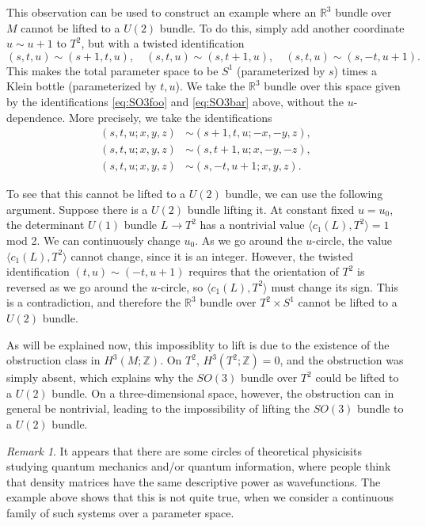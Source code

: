 \documentclass[12pt]{article}
\numberwithin{equation}{section}
\theoremstyle{remark}
\newtheorem{remark}[definition]{Remark}
\def\bR{\mathbb{R}}
\def\bZ{\mathbb{Z}}
\begin{document}
This observation can be used to construct an example
where an $\bR^3$ bundle over $M$ cannot be lifted to a $U(2)$ bundle.
To do this, simply add another coordinate $u\sim u+1$ to $T^2$,
but with a twisted identification \begin{equation}
(s,t,u) \sim (s+1,t,u),\quad
(s,t,u) \sim (s,t+1,u),\quad
(s,t,u) \sim (s,-t,u+1).
\end{equation}
This makes the total parameter space to be $S^1$ (parameterized by $s$)
times a Klein bottle (parameterized by $t,u$).
We take the $\bR^3$ bundle over this space given by the identifications \eqref{eq:SO3foo} and \eqref{eq:SO3bar} above,
without the $u$-dependence. More precisely, we take the identifications \begin{align}
  (s,t,u;x,y,z) &\sim (s+1,t,u;-x,-y,z),\\
  (s,t,u;x,y,z) &\sim (s,t+1,u;x,-y,-z),\\
  (s,t,u;x,y,z) &\sim (s,-t,u+1;x,y,z).
\end{align}

To see that this cannot be lifted to a $U(2)$ bundle, we can use the following argument.
Suppose there is a $U(2)$ bundle lifting it.
At constant fixed $u=u_0$, the determinant $U(1)$ bundle $L\to T^2$
has a nontrivial value $\langle c_1(L),T^2\rangle = 1 $ mod 2.
We can continuously change $u_0$.
As we go around the $u$-circle, the value $ \langle c_1(L),T^2\rangle$
cannot change, since it is an integer.
However, the twisted identification $(t,u)\sim (-t,u+1)$
requires that the orientation of $T^2$ is reversed as we go around the $u$-circle,
so $\langle c_1(L),T^2\rangle$ must change its sign.
This is a contradiction, and therefore the $\bR^3$ bundle over $T^2\times S^1$ cannot be lifted to a $U(2)$ bundle.

As will be explained now, this impossiblity to lift is 
due to the existence of the obstruction class in $H^3(M;\bZ)$.
On $T^2$, $H^3(T^2;\bZ)=0$, and the obstruction was simply absent,
which explains why the $SO(3)$ bundle over $T^2$ could be lifted to a $U(2)$ bundle.
On a three-dimensional space, however, the obstruction can in general be nontrivial,
leading to the impossibility of lifting the $SO(3)$ bundle to a $U(2)$ bundle.

\begin{remark}
It appears that there are some circles of theoretical physicisits studying 
quantum mechanics and/or quantum information,
where people think that density matrices have 
the same descriptive power as wavefunctions.
The example above shows that this is not quite true,
when we consider a continuous family of such systems over a parameter space.
\end{remark}
\fi
\end{document}
